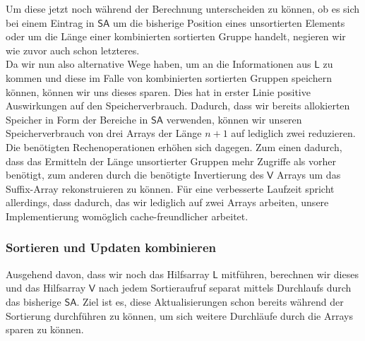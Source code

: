 Um diese jetzt noch während der Berechnung unterscheiden zu können, ob es sich bei einem Eintrag in $\mathsf{SA}$ um die bisherige Position eines unsortierten Elements oder um die Länge einer kombinierten sortierten Gruppe handelt, negieren wir wie zuvor auch schon letzteres.\\
Da wir nun also alternative Wege haben, um an die Informationen aus $\mathsf{L}$ zu kommen und diese im Falle von kombinierten sortierten Gruppen speichern können, können wir uns dieses sparen. Dies hat in erster Linie positive Auswirkungen auf den Speicherverbrauch. Dadurch, dass wir bereits allokierten Speicher in Form der Bereiche in $\mathsf{SA}$ verwenden, können wir unseren Speicherverbrauch von drei Arrays der Länge $n+1$ auf lediglich zwei reduzieren. Die benötigten Rechenoperationen erhöhen sich dagegen. Zum einen dadurch, dass das Ermitteln der Länge unsortierter Gruppen mehr Zugriffe als vorher benötigt, zum anderen durch die benötigte Invertierung des $\mathsf{V}$ Arrays um das Suffix-Array rekonstruieren zu können. Für eine verbesserte Laufzeit spricht allerdings, dass dadurch, das wir lediglich auf zwei Arrays arbeiten, unsere Implementierung womöglich cache-freundlicher arbeitet.
\subsubsection{Sortieren und Updaten kombinieren}
Ausgehend davon, dass wir noch das Hilfsarray $\mathsf{L}$ mitführen, berechnen wir dieses und das Hilfsarray $\mathsf{V}$ nach jedem Sortieraufruf separat mittels Durchlaufs durch das bisherige $\mathsf{SA}$. Ziel ist es, diese Aktualisierungen schon bereits während der Sortierung durchführen zu können, um sich weitere Durchläufe durch die Arrays sparen zu können. 

